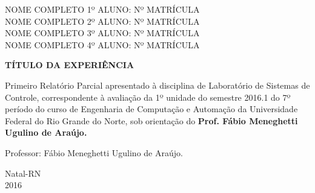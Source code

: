 \documentclass[a4paper,12pt]{article}
\begin{document}
\newpage


\thispagestyle{empty}

\begin{center}
\begin{normalsize}
NOME COMPLETO 1º ALUNO: Nº MATRÍCULA\\
\vspace{0.8cm}
NOME COMPLETO 2º ALUNO: Nº MATRÍCULA\\
\vspace{0.8cm}
NOME COMPLETO 3º ALUNO: Nº MATRÍCULA\\
\vspace{0.8cm}
NOME COMPLETO 4º ALUNO: Nº MATRÍCULA\\

\end{normalsize}
\end{center}
\vspace{3cm}

{\bf{\large {\centering TÍTULO DA EXPERIÊNCIA\\}}}

\vspace{4cm}

\begin{adjustwidth}{7.5cm}{0cm}

{\normalsize

Primeiro Relatório Parcial apresentado à disciplina de
Laboratório de Sistemas de Controle, correspondente à
avaliação da 1º unidade do semestre 2016.1 do 7º período
do curso de Engenharia de Computação e Automação da
Universidade Federal do Rio Grande do Norte, sob
orientação do {\bf Prof. Fábio Meneghetti Ugulino de
Araújo.}

}

\end{adjustwidth}

\vspace{2cm}

\begin{center}

Professor:  Fábio Meneghetti Ugulino de Araújo.

\vspace{2.5cm}

{\large Natal-RN\\
2016}

\end{center}

\newpage

\end{document}
